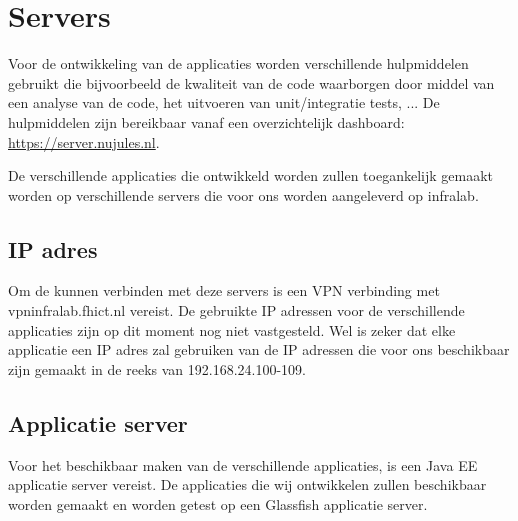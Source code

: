 \section{Servers}
Voor de ontwikkeling van de applicaties worden verschillende hulpmiddelen gebruikt die bijvoorbeeld de kwaliteit van de code waarborgen door middel van een analyse van de code, het uitvoeren van unit/integratie tests, ...
De hulpmiddelen zijn bereikbaar vanaf een overzichtelijk dashboard: \href{https://server.nujules.nl}{https://server.nujules.nl}.

De verschillende applicaties die ontwikkeld worden zullen toegankelijk gemaakt worden op verschillende servers die voor ons worden aangeleverd op infralab.

\subsection{IP adres}

Om de kunnen verbinden met deze servers is een VPN verbinding met vpninfralab.fhict.nl vereist. De gebruikte IP adressen voor de verschillende applicaties zijn op dit moment nog niet vastgesteld. Wel is zeker dat elke applicatie een IP adres zal gebruiken van de IP adressen die voor ons beschikbaar zijn gemaakt in de reeks van 192.168.24.100-109.

\subsection{Applicatie server}
Voor het beschikbaar maken van de verschillende applicaties, is een Java EE applicatie server vereist. De applicaties die wij ontwikkelen zullen beschikbaar worden gemaakt en worden getest op een Glassfish applicatie server.

